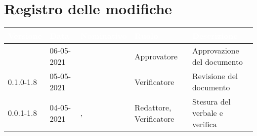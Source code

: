 \section*{Registro delle modifiche}
{
\setcounter{table}{-1}
{
\renewcommand{\arraystretch}{1.5}
\centering
\begin{longtable}{C{1.7cm} | C{2.5cm} | C{3.2cm} | C{2.7cm} | C{4.8cm}}
\textcolor{white}{\textbf{Versione}}&
\textcolor{white}{\textbf{Data}}&
\textcolor{white}{\textbf{Nominativo}}&
\textcolor{white}{\textbf{Ruolo}}&
\textcolor{white}{\textbf{Descrizione}}\\	
\endhead

\Versionedoc{} & 06-05-2021 & \Approvatore{} & Approvatore & Approvazione del documento\\	
0.1.0-1.8 & 05-05-2021 & \PA{} & Verificatore & Revisione del documento\\		
0.0.1-1.8 & 04-05-2021 & \Redattori{}, \SH{} & Redattore, Verificatore & Stesura del verbale e verifica\\
		
\end{longtable}
}
}
